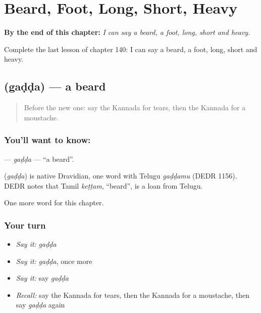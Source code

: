 
\chapter{Beard, Foot, Long, Short, Heavy}
\label{ch:ka-beard-foot-long-short-heavy}

\begin{chapteropening}
\textbf{By the end of this chapter:} \emph{I can say a beard, a foot, long, short and heavy.}

Complete the last lesson of chapter 140: I can say a beard, a foot, long, short and heavy.
\end{chapteropening}

\section[\texorpdfstring{\kn{ಗಡ್ಡ} (gaḍḍa)}{ಗಡ್ಡ (gaḍḍa)}]{ (gaḍḍa) — a beard}

\label{lesson:KA-C140-gadda}



\begin{quote}
Before the new one: say the Kannada for tears, then the Kannada for a moustache.
\end{quote}

\subsection*{You'll want to know: }
\textbf{} — \emph{gaḍḍa} — \textquotedblleft{}a beard\textquotedblright{}.

\begin{cousinweb}
\textbf{} (\emph{gaḍḍa}) is native Dravidian, one word with Telugu \emph{gaḍḍamu} (DEDR 1156). DEDR notes that Tamil \emph{keṭṭam}, \textquotedblleft{}beard\textquotedblright{}, is a loan from Telugu.
\end{cousinweb}

\begin{grammarlens}[title={What you've built}]
One more word for this chapter.
\end{grammarlens}

\subsection*{Your turn}
\begin{itemize}
\raggedright
  \item \emph{Say it:} \emph{gaḍḍa}
  \item \emph{Say it:} \emph{gaḍḍa}, once more
  \item \emph{Say it:} say \emph{gaḍḍa}
  \item \emph{Recall:} say the Kannada for tears, then the Kannada for a moustache, then say \emph{gaḍḍa} again
\end{itemize}

